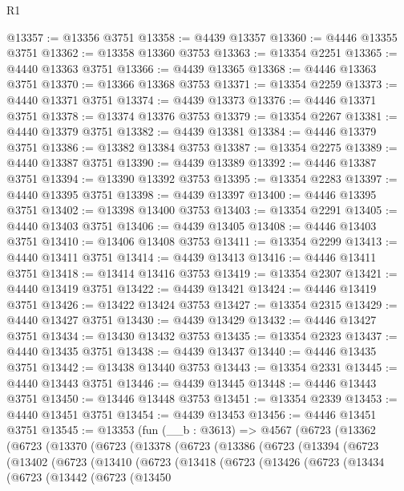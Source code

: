 \begin{lexlean}{R1}
\begin{coremodule}
@13357 := @13356 @3751
@13358 := @4439 @13357
@13360 := @4446 @13355 @3751
@13362 := @13358 @13360 @3753
@13363 := @13354 @2251
@13365 := @4440 @13363 @3751
@13366 := @4439 @13365
@13368 := @4446 @13363 @3751
@13370 := @13366 @13368 @3753
@13371 := @13354 @2259
@13373 := @4440 @13371 @3751
@13374 := @4439 @13373
@13376 := @4446 @13371 @3751
@13378 := @13374 @13376 @3753
@13379 := @13354 @2267
@13381 := @4440 @13379 @3751
@13382 := @4439 @13381
@13384 := @4446 @13379 @3751
@13386 := @13382 @13384 @3753
@13387 := @13354 @2275
@13389 := @4440 @13387 @3751
@13390 := @4439 @13389
@13392 := @4446 @13387 @3751
@13394 := @13390 @13392 @3753
@13395 := @13354 @2283
@13397 := @4440 @13395 @3751
@13398 := @4439 @13397
@13400 := @4446 @13395 @3751
@13402 := @13398 @13400 @3753
@13403 := @13354 @2291
@13405 := @4440 @13403 @3751
@13406 := @4439 @13405
@13408 := @4446 @13403 @3751
@13410 := @13406 @13408 @3753
@13411 := @13354 @2299
@13413 := @4440 @13411 @3751
@13414 := @4439 @13413
@13416 := @4446 @13411 @3751
@13418 := @13414 @13416 @3753
@13419 := @13354 @2307
@13421 := @4440 @13419 @3751
@13422 := @4439 @13421
@13424 := @4446 @13419 @3751
@13426 := @13422 @13424 @3753
@13427 := @13354 @2315
@13429 := @4440 @13427 @3751
@13430 := @4439 @13429
@13432 := @4446 @13427 @3751
@13434 := @13430 @13432 @3753
@13435 := @13354 @2323
@13437 := @4440 @13435 @3751
@13438 := @4439 @13437
@13440 := @4446 @13435 @3751
@13442 := @13438 @13440 @3753
@13443 := @13354 @2331
@13445 := @4440 @13443 @3751
@13446 := @4439 @13445
@13448 := @4446 @13443 @3751
@13450 := @13446 @13448 @3753
@13451 := @13354 @2339
@13453 := @4440 @13451 @3751
@13454 := @4439 @13453
@13456 := @4446 @13451 @3751
@13545 := @13353
    (fun (__b : @3613) =>
    @4567
      (@6723
        (@13362
          (@6723
            (@13370
              (@6723
                (@13378
                  (@6723
                    (@13386
                      (@6723
                        (@13394
                          (@6723
                            (@13402
                              (@6723
                                (@13410
                                  (@6723
                                    (@13418
                                      (@6723
                                        (@13426
                                          (@6723
                                            (@13434
                                              (@6723
                                                (@13442
                                                  (@6723
                                                    (@13450

\end{coremodule}
\end{lexlean}
